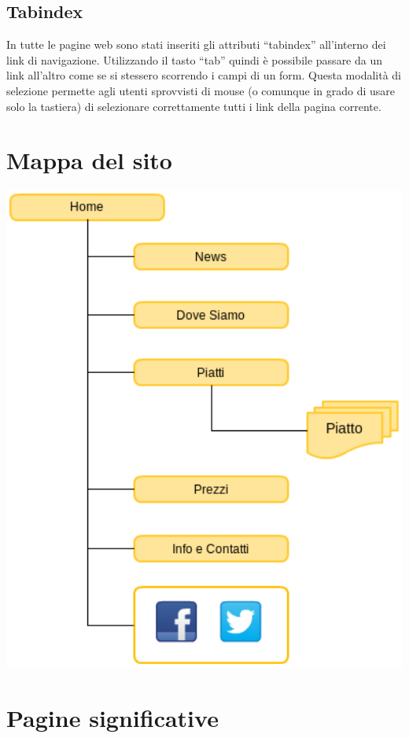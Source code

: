 \documentclass[10pt,a4paper,onecolumn]{article}
\begin{document}
\subsection{Tabindex}

In tutte le pagine web sono stati inseriti gli attributi ``tabindex'' all'interno dei link di navigazione. Utilizzando il tasto ``tab'' quindi è possibile passare da un link all'altro come se si stessero scorrendo i campi di un form. Questa modalità di selezione permette agli utenti sprovvisti di mouse (o comunque in grado di usare solo la tastiera) di selezionare correttamente tutti i link della pagina corrente.

\clearpage

\section{Mappa del sito}
\includegraphics[width=1\textwidth]{mappasito.png}


\clearpage

\section{Pagine significative}
\end{document}
